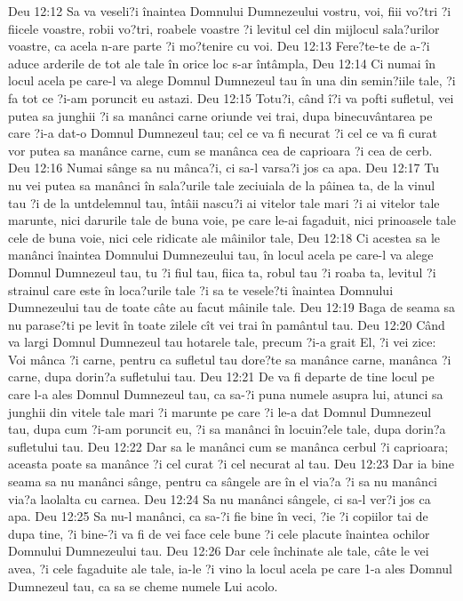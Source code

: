 Deu 12:12  Sa va veseli?i înaintea Domnului Dumnezeului vostru, voi, fiii vo?tri ?i fiicele voastre, robii vo?tri, roabele voastre ?i levitul cel din mijlocul sala?urilor voastre, ca acela n-are parte ?i mo?tenire cu voi.
Deu 12:13  Fere?te-te de a-?i aduce arderile de tot ale tale în orice loc s-ar întâmpla,
Deu 12:14  Ci numai în locul acela pe care-l va alege Domnul Dumnezeul tau în una din semin?iile tale, ?i fa tot ce ?i-am poruncit eu astazi.
Deu 12:15  Totu?i, când î?i va pofti sufletul, vei putea sa junghii ?i sa manânci carne oriunde vei trai, dupa binecuvântarea pe care ?i-a dat-o Domnul Dumnezeul tau; cel ce va fi necurat ?i cel ce va fi curat vor putea sa manânce carne, cum se manânca cea de caprioara ?i cea de cerb.
Deu 12:16  Numai sânge sa nu mânca?i, ci sa-l varsa?i jos ca apa.
Deu 12:17  Tu nu vei putea sa manânci în sala?urile tale zeciuiala de la pâinea ta, de la vinul tau ?i de la untdelemnul tau, întâii nascu?i ai vitelor tale mari ?i ai vitelor tale marunte, nici darurile tale de buna voie, pe care le-ai fagaduit, nici prinoasele tale cele de buna voie, nici cele ridicate ale mâinilor tale,
Deu 12:18  Ci acestea sa le manânci înaintea Domnului Dumnezeului tau, în locul acela pe care-l va alege Domnul Dumnezeul tau, tu ?i fiul tau, fiica ta, robul tau ?i roaba ta, levitul ?i strainul care este în loca?urile tale ?i sa te vesele?ti înaintea Domnului Dumnezeului tau de toate câte au facut mâinile tale.
Deu 12:19  Baga de seama sa nu parase?ti pe levit în toate zilele cît vei trai în pamântul tau.
Deu 12:20  Când va largi Domnul Dumnezeul tau hotarele tale, precum ?i-a grait El, ?i vei zice: Voi mânca ?i carne, pentru ca sufletul tau dore?te sa manânce carne, manânca ?i carne, dupa dorin?a sufletului tau.
Deu 12:21  De va fi departe de tine locul pe care l-a ales Domnul Dumnezeul tau, ca sa-?i puna numele asupra lui, atunci sa junghii din vitele tale mari ?i marunte pe care ?i le-a dat Domnul Dumnezeul tau, dupa cum ?i-am poruncit eu, ?i sa manânci în locuin?ele tale, dupa dorin?a sufletului tau.
Deu 12:22  Dar sa le manânci cum se manânca cerbul ?i caprioara; aceasta poate sa manânce ?i cel curat ?i cel necurat al tau.
Deu 12:23  Dar ia bine seama sa nu manânci sânge, pentru ca sângele are în el via?a ?i sa nu manânci via?a laolalta cu carnea.
Deu 12:24  Sa nu manânci sângele, ci sa-l ver?i jos ca apa.
Deu 12:25  Sa nu-l manânci, ca sa-?i fie bine în veci, ?ie ?i copiilor tai de dupa tine, ?i bine-?i va fi de vei face cele bune ?i cele placute înaintea ochilor Domnului Dumnezeului tau.
Deu 12:26  Dar cele închinate ale tale, câte le vei avea, ?i cele fagaduite ale tale, ia-le ?i vino la locul acela pe care 1-a ales Domnul Dumnezeul tau, ca sa se cheme numele Lui acolo.
